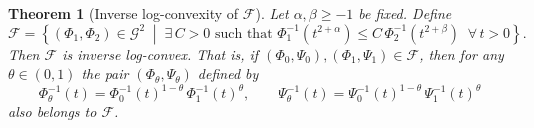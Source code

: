 \documentclass[12pt]{amsart}
\newtheorem{theorem}{Theorem}
\begin{document}
 
\begin{theorem}[Inverse log-convexity of $\mathcal{F}$]\label{thm:inverse-convexity-F}
Let $\alpha,\beta \ge -1$ be fixed. Define
\[
\mathcal{F} = \left\{ (\Phi_1,\Phi_2) \in \mathcal{G}^2 \;\middle|\;
\exists\, C > 0 \text{ such that }
\Phi_1^{-1}\!\left( t^{2+\alpha} \right) \le C\,
\Phi_2^{-1}\!\left( t^{2+\beta} \right) \;\; \forall\, t>0
\right\}.
\]
Then $\mathcal{F}$ is inverse log-convex. That is, if $(\Phi_0,\Psi_0), (\Phi_1,\Psi_1) \in \mathcal{F}$,
then for any $\theta \in (0,1)$ the pair $(\Phi_\theta,\Psi_\theta)$ defined by
\[
\Phi_\theta^{-1}(t) = \Phi_0^{-1}(t)^{1-\theta} \, \Phi_1^{-1}(t)^{\theta},
\qquad
\Psi_\theta^{-1}(t) = \Psi_0^{-1}(t)^{1-\theta} \, \Psi_1^{-1}(t)^{\theta}
\]
also belongs to $\mathcal{F}$.
\end{theorem}
\end{document}
